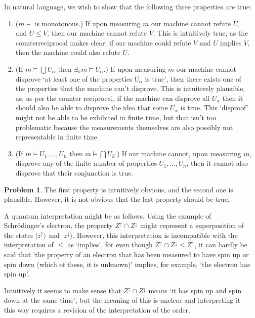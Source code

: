 \documentclass{article}
\theoremstyle{definition}
\newtheorem{problem}{Problem}
\begin{document}
In natural language, we wish to show that the following three properties are true:
\begin{enumerate}
\item ($m\vDash$ is monotonous.) If upon measuring $m$ our machine cannot refute $U$, and $U \leq V$, then our machine cannot refute $V$. This is intuitively true, as the counterreciprocal makes clear: if our machine could refute $V$ and $U$ implies $V$, then the machine could also refute $U$.

\item (If $m\vDash \bigcup U_\alpha$ then $\exists_\alpha m \vDash U_\alpha$.) If upon measuring $m$ our machine cannot disprove `at least one of the properties $U_\alpha$ is true', then there exists one of the properties that the machine can't disprove. This is intuitively plausible, as, as per the counter reciprocal, if the machine can disprove all $U_\alpha$ then it should also be able to disprove the idea that some $U_\alpha$ is true. This `disproof' might not be able to be exhibited in finite time, but that isn't too problematic because the measurements themselves are also possibly not representable in finite time.

\item (If $m\vDash U_1, \dots, U_n$ then $m \vDash \bigcap U_k$.) If our machine cannot, upon measuring $m$, disprove any of the finite number of properties $U_1, \dots, U_n$, then it cannot also disprove that their conjunction is true.
\end{enumerate}

\begin{problem}\label{probhom}
The first property is intuitively obvious, and the second one is plausible. However, it is not obvious that the last property should be true.

A quantum interpretation might be as follows. Using the example of Schrödinger's electron, the property $Z^\uparrow \cap Z^\downarrow$ might represent a superposition of the states $\lvert z^\uparrow \rangle$ and $\lvert z^\downarrow \rangle$. However, this interpretation is incompatible with the interpretation of $\leq$ as `implies', for even though $Z^\uparrow \cap Z^\downarrow \leq Z^\uparrow$, it can hardly be said that `the property of an electron that has been measured to have spin up or spin down (which of these, it is unknown)' implies, for example, `the electron has spin up'. 

Intuitively it seems to make sense that $Z^\uparrow \cap Z^\downarrow$ means `it has spin up and spin down at the same time', but the meaning of this is unclear and interpreting it this way requires a revision of the interpretation of the order.
\end{problem}
\end{document}
